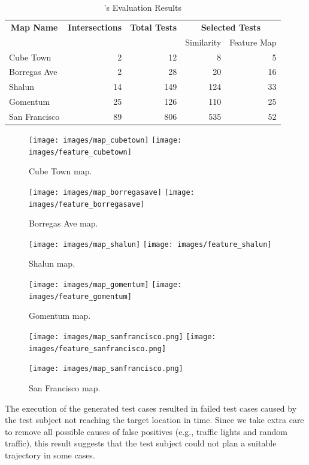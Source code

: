 \documentclass[conference]{IEEEtran}
\begin{document}
\begin{table}[t]
    \centering
      \caption{\tool's Evaluation Results}
      \label{tab:results}
      \begin{tabular}{lrrrr}
        \toprule
        \multicolumn{1}{c}{\textbf{Map Name}}&
        \multicolumn{1}{c}{\textbf{Intersections}}&
        \multicolumn{1}{c}{\textbf{Total Tests}}&
        \multicolumn{2}{c}{\textbf{Selected Tests}} \\
        & & & Similarity & Feature Map\\
        \midrule
        Cube Town & 2 & 12 & 8 & 5\\
        Borregas Ave & 2 & 28 & 20 & 16\\
        Shalun & 14 & 149 & 124 & 33\\
        Gomentum & 25 & 126 & 110 & 25\\
        San Francisco & 89 & 806 & 535 & 52\\
        \bottomrule
      \end{tabular}
\end{table}



\begin{figure}[!tp]
  \texttt{[image: images/map\_cubetown]}
  \texttt{[image: images/feature\_cubetown]}
  \caption{Cube Town map.}
\endminipage\hfill
{}
  \texttt{[image: images/map\_borregasave]}
  \texttt{[image: images/feature\_borregasave]}
  \caption{Borregas Ave map.}
\endminipage\hfill
{}%
  \texttt{[image: images/map\_shalun]}
  \texttt{[image: images/feature\_shalun]}
  \caption{Shalun map.}
\endminipage

%
  \texttt{[image: images/map\_gomentum]}
  \texttt{[image: images/feature\_gomentum]}
  \caption{Gomentum map.}
\endminipage\hfill
{}%
  \texttt{[image: images/map\_sanfrancisco.png]}
  \texttt{[image: images/feature\_sanfrancisco.png]}
  \caption{San Francisco map.}
\endminipage
{}%
    \texttt{[image: images/map\_sanfrancisco.png]}
\endminipage
\label{fig:feature-maps-results}
\end{figure}

The execution of the generated test cases resulted in failed test cases caused by the test subject not reaching the target location in time. Since we take extra care to remove all possible causes of false positives (e.g., traffic lights and random traffic), this result suggests that the test subject could not plan a suitable trajectory in some cases.
\end{document}
